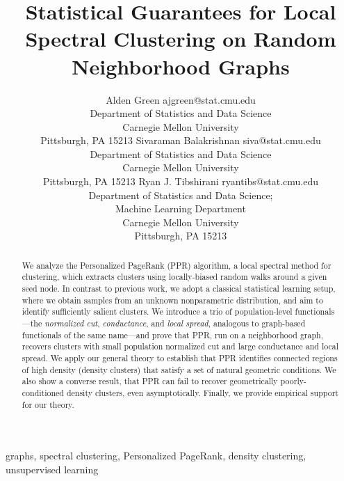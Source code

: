 \documentclass[11pt,twoside]{article}
\newcommand{\1}{\mathbf{1}}
\begin{document}
	
\title{Statistical Guarantees for Local Spectral Clustering on Random Neighborhood Graphs}

\author{\name Alden Green \email ajgreen@stat.cmu.edu \\
	\addr Department of Statistics and Data Science\\
	Carnegie Mellon University\\
	Pittsburgh, PA 15213
	\AND
	\name Sivaraman Balakrishnan \email siva@stat.cmu.edu \\
	\addr Department of Statistics and Data Science\\
	Carnegie Mellon University\\
	Pittsburgh, PA 15213
	\AND
	Ryan J. Tibshirani \email ryantibs@stat.cmu.edu \\
	\addr Department of Statistics and Data Science; \\
	Machine Learning Department\\
	Carnegie Mellon University\\
	Pittsburgh, PA 15213}

\maketitle

\begin{abstract}
	We analyze the Personalized PageRank (PPR) algorithm, a local spectral method
	for clustering, which extracts clusters using locally-biased random walks around
	a given seed node.  In contrast to previous work, we adopt a classical
	statistical learning setup, where we obtain samples from an unknown nonparametric distribution, and aim to identify sufficiently salient clusters.  We introduce a trio of population-level functionals---the \emph{normalized cut}, \emph{conductance}, and \emph{local spread}, analogous to graph-based functionals of the same name---and prove that PPR, run on a neighborhood graph, recovers clusters with small population normalized cut and large conductance and local spread. We apply our general theory to establish that PPR identifies connected regions of high density (density clusters) that satisfy a set of natural geometric conditions. We also show a converse result, that PPR can fail to recover
	geometrically poorly-conditioned density clusters, even asymptotically. Finally,
	we provide empirical support for our theory.
\end{abstract}

\begin{keywords}
	graphs, spectral clustering, Personalized PageRank, density clustering, unsupervised learning
\end{keywords}
\end{document}
